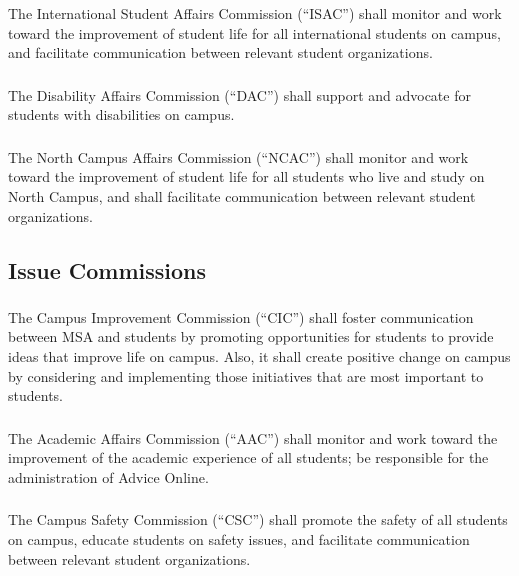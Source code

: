 \subsubsection{}
The International Student Affairs Commission (``ISAC'') shall monitor and work toward the improvement of student life for all international students on campus, and facilitate communication between relevant student organizations.

\subsubsection{}
The Disability Affairs Commission (``DAC'') shall support and advocate for students with disabilities on campus.

\subsubsection{}
The North Campus Affairs Commission (``NCAC'') shall monitor and work toward the improvement of student life for all students who live and study on North Campus, and shall facilitate communication between relevant student organizations.


\subsection{Issue Commissions}

\subsubsection{}
The Campus Improvement Commission (``CIC'') shall foster communication between MSA and students by promoting opportunities for students to provide ideas that improve life on campus. Also, it shall create positive change on campus by considering and implementing those initiatives that are most important to students.

\subsubsection{}
The Academic Affairs Commission (``AAC'') shall 
\subsubsubsection{}
monitor and work toward the improvement of the academic experience of all students;
\subsubsubsection{}
be responsible for the administration of Advice Online.

\subsubsection{}
The Campus Safety Commission (``CSC'') shall promote the safety of all students on campus, educate students on safety issues, and facilitate communication between relevant student organizations.

